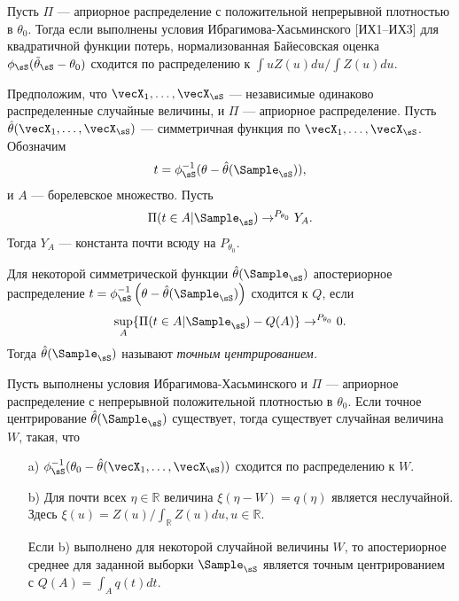 
\begin{Theorem}
Пусть $\Pi$ --- априорное распределение с положительной непрерывной плотностью в $\theta_0$. 
Тогда если выполнены условия Ибрагимова-Хасьминского [ИХ1--ИХ3] для квадратичной функции потерь, нормализованная Байесовская оценка $\phi_{\sS} (\tilde{\theta}_{\sS} - \theta_0)$ сходится по распределению к $\int u Z(u) du / \int Z(u) du$.
\end{Theorem}

\begin{Proposition}
Предположим, что $\vecX_1, \ldots, \vecX_{\sS}$ --- независимые одинаково распределенные случайные величины, и $\Pi$ --- априорное распределение.
Пусть $\hat{\theta}(\vecX_1, \ldots, \vecX_{\sS})$ --- симметричная функция по $\vecX_1, \ldots, \vecX_{\sS}$. Обозначим
\[
t = \phi_{\sS}^{-1} (\theta - \hat{\theta}(\Sample_{\sS})),
\]
и $A$ --- борелевское множество.
Пусть
\[
\Pi(t \in A| \Sample_{\sS}) \rightarrow^{P_{\theta_0}} Y_A.
\]
Тогда $Y_A$ --- константа почти всюду на $P_{\theta_0}$.
\end{Proposition}

\begin{Definition}
Для некоторой симметрической функции $\hat{\theta}(\Sample_{\sS})$ апостериорное распределение $t = \phi_{\sS}^{-1} \left(\theta - \hat{\theta}(\Sample_{\sS}) \right)$ сходится к $Q$, если 
\[
\sup_{A} \{\Pi(t \in A| \Sample_{\sS}) - Q(A)\} \rightarrow^{P_{\theta_0}} 0.
\]
Тогда $\hat{\theta}(\Sample_{\sS})$ называют \emph{точным центрированием.}
\end{Definition}

\begin{Theorem}
Пусть выполнены условия Ибрагимова-Хасьминского и $\Pi$ --- априорное распределение с непрерывной положительной плотностью в $\theta_0$. 
Если точное центрирование $\hat{\theta}(\Sample_{\sS})$ существует, тогда существует случайная величина $W\!$, такая, что
\begin{itemize}
\item[a)] $\phi_{\sS}^{-1}(\theta_0 - \hat{\theta}(\vecX_1, \ldots, \vecX_{\sS}))$ сходится по распределению к $W$.
\item[b)] Для почти всех $\eta \in \mathbb{R}$ величина $\xi(\eta - W) = q(\eta)$ является неслучайной. Здесь $\xi(u) = Z(u) / \int_{\mathbb{R}} Z(u) du, u \in \mathbb{R}$.

Если b) выполнено для некоторой случайной величины $W$, то апостериорное среднее для заданной выборки $\Sample_\sS$ является точным центрированием с $Q(A) = \int_{A} q(t) dt$.
\end{itemize}
\end{Theorem}
